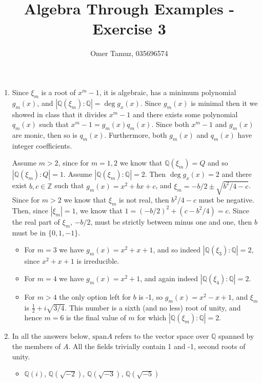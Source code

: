 \documentclass[11pt]{article} \usepackage{amssymb}
\newcommand{\Q}{\mathbb Q}
\newcommand{\Z}{\mathbb Z} \newcommand{\CalE}{{\mathcal{E}}}
\newcommand{\half}{{\textstyle \frac12}}
\begin{document}
\title{Algebra Through Examples - Exercise 3}

 \author{Omer Tamuz, 035696574}
\maketitle


\begin{enumerate}
\item 
  Since $\xi_m$ is a root of $x^m-1$, it is algebraic, has
  a minimum polynomial $g_m(x)$, and $|\Q(\xi_m):\Q|=\deg g_x(x)$. 
  Since $g_m(x)$ is minimal then it we showed in class that it divides
  $x^m-1$ and
  there exists some polynomial $q_m(x)$ such that $x^m-1=g_m(x)q_m(x)$. Since both
  $x^m-1$ and $g_m(x)$ are monic, then so is $q_m(x)$. Furthermore, both $g_m(x)$ and
  $q_m(x)$ have integer coefficients. 

  Assume $m>2$, since for $m=1,2$ we know that $\Q(\xi_m)=Q$ and so 
  $|\Q(\xi_m):Q|=1$.
  Assume $|\Q(\xi_m):\Q|=2$. Then $\deg g_x(x)=2$ and there exist $b,c \in \Z$ such that
  $g_m(x)=x^2+bx+c$, and $\xi_m=-b/2\pm \sqrt{b^2/4-c}$. Since for $m>2$ 
  we know that $\xi_m$
  is not real, then $b^2/4-c$ must be negative. Then, since $|\xi_m|=1$, we
  know that $1=(-b/2)^2+(c-b^2/4)=c$. Since the real part of $\xi_m$, $-b/2$, must be
  strictly between minus one and one, then $b$ must be in $\{0,1,-1\}$. 

  \begin{itemize}
  \item For $m=3$ we have $g_m(x)=x^2+x+1$, and so indeed 
    $|\Q(\xi_3):\Q|=2$, since $x^2+x+1$ is irreducible.
  \item For $m=4$ we have $g_m(x)=x^2+1$, and again indeed
    $|\Q(\xi_4):\Q|=2$.
  \item For $m>4$ the only option left for $b$ is -1, so $g_m(x)=x^2-x+1$, 
    and $\xi_m$ is
    $\half+i\sqrt{3/4}$. This number is a sixth (and no less) root of unity, and hence
    $m=6$ is the final value of $m$ for which  $|\Q(\xi_m):\Q|=2$.
  \end{itemize}

  \item 
    In all the answers below, $\mbox{span}A$ refers to the vector space
    over $\Q$ spanned by the members of $A$. All the fields trivially contain
    1 and -1, second roots of unity.

    \begin{itemize}
    \item $\Q(i)$, $\Q(\sqrt{-2})$, $\Q(\sqrt{-3})$, $\Q(\sqrt{-5})$


\end{itemize}
\end{enumerate}
\end{document}
